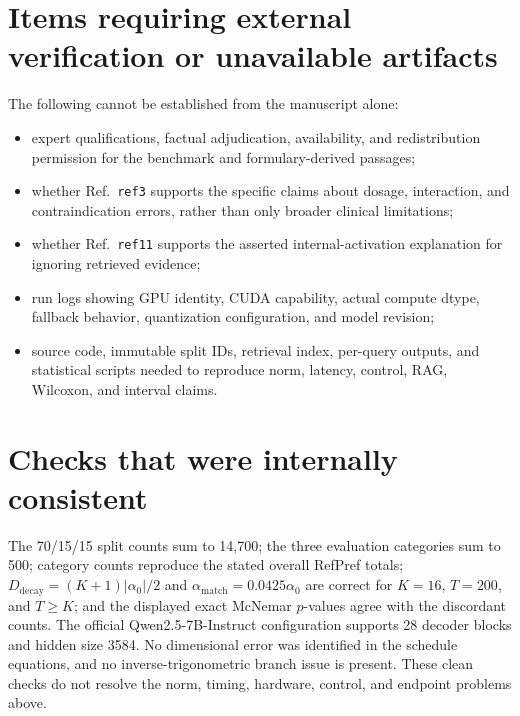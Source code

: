 \documentclass[11pt]{article}
\begin{document}
\section*{Items requiring external verification or unavailable artifacts}

The following cannot be established from the manuscript alone:

\begin{itemize}
 \item expert qualifications, factual adjudication, availability, and redistribution permission for the benchmark and formulary-derived passages;
 \item whether Ref.~\texttt{ref3} supports the specific claims about dosage, interaction, and contraindication errors, rather than only broader clinical limitations;
 \item whether Ref.~\texttt{ref11} supports the asserted internal-activation explanation for ignoring retrieved evidence;
 \item run logs showing GPU identity, CUDA capability, actual compute dtype, fallback behavior, quantization configuration, and model revision;
 \item source code, immutable split IDs, retrieval index, per-query outputs, and statistical scripts needed to reproduce norm, latency, control, RAG, Wilcoxon, and interval claims.
\end{itemize}

\section*{Checks that were internally consistent}

The 70/15/15 split counts sum to 14,700; the three evaluation categories sum to 500; category counts reproduce the stated overall RefPref totals; $D_{\text{decay}}=(K+1)|\alpha_0|/2$ and $\alpha_{\text{match}}=0.0425\alpha_0$ are correct for $K=16$, $T=200$, and $T\ge K$; and the displayed exact McNemar $p$-values agree with the discordant counts.  The official Qwen2.5-7B-Instruct configuration supports 28 decoder blocks and hidden size 3584.  No dimensional error was identified in the schedule equations, and no inverse-trigonometric branch issue is present.  These clean checks do not resolve the norm, timing, hardware, control, and endpoint problems above.
\end{document}
